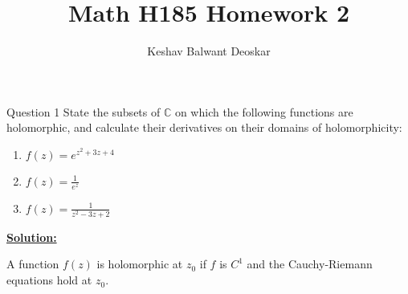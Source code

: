 \documentclass{article}
\title{Math H185 Homework 2}
\author{Keshav Balwant Deoskar}
\newcommand{\C}{\mathbb{C}}
\begin{document}
\maketitle


\begin{mathdefinitionbox}{Question 1}
\vskip 0.5cm
State the subsets of $\C$ on which the following functions are holomorphic, and calculate their derivatives on their domains of holomorphicity:
  \begin{enumerate}[label=(\alph*)]
    \item $f(z) = e^{z^2 + 3z + 4}$
    \item $f(z) = \frac{1}{e^{z}}$
    \item $f(z) = \frac{1}{z^2 - 3z + 2}$
  \end{enumerate}
\end{mathdefinitionbox}

\vskip 0.5cm
\underline{\textbf{Solution:}} 

A function $f(z)$ is holomorphic at $z_0$ if $f$ is $C^1$ and the Cauchy-Riemann equations hold at $z_0$.
\end{document}
